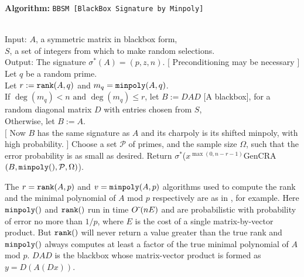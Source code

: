 \documentclass{acm_proc_article-sp}
\makeatletter
\newcommand{\softO}{{O\mskip1mu\tilde{\,}\mskip1mu}}
\newcommand{\rank}[1]{\ensuremath{\mbox{\tt rank}(#1)}}
\newcommand{\minpoly}[1]{\ensuremath{\mbox{\tt minpoly}(#1)}}
\newcommand{\shiftminpoly}[1]{\ensuremath{\mbox{\tt shiftminpoly}(#1)}}
\newlength{\Stmtindent}
\newenvironment{algorithm}[1]
{
   \setlength{\Stmtindent}{10pt}
   \def\Stmt{\@ifnextchar[{\@Stmt}{\@Stmt[]}}
   \def\@Stmt[##1]{\par\hspace*{\Stmtindent}\llap{##1\enspace\hfil}%
                   \hangindent\Stmtindent\ignorespaces}
   \def\Inspec{\par\hangindent0pt\noindent%
               \rlap{\@alginheader}\gdef\@alginheader{}%
               \hangindent1.0\Stmtindent\ignorespaces}
   \def\Outspec{\par\hangindent0pt\noindent%
                \rlap{\@algoutheader}\gdef\@algoutheader{}%
                \hangindent1.0\Stmtindent\ignorespaces}
   \def\Procspec{\par\hangindent0pt\noindent%
                \rlap{\@algprocheader}\gdef\@algprocheader{}%
                \hangindent1.0\Stmtindent\ignorespaces
				}
   \def\>{\advance\hangindent\Stmtindent\hspace*{\Stmtindent}\ignorespaces}
   \def\@alginheader{Input:}
   \def\@algoutheader{Output:}
   \def\@algprocheader{Method:}

   \parindent=0pt
   \parskip=1pt

   \medbreak\par {\bf Algorithm: }{\tt #1}
}
{\smallbreak}
\newcommand{\signature}{\ensuremath{\sigma^{*}}}
\newcommand{\M}[2]{\ensuremath{J_{#2}({#1})}}
\newcommand{\rSize}{\ensuremath{\Omega}}
\newcommand{\set}{\ensuremath{\mathcal P}}
\makeatother
\begin{document}
\begin{algorithm} {BBSM [BlackBox Signature by Minpoly]\label{bbsm}}
\\Input:  $A$, a symmetric matrix in blackbox form,\\
$S$, a set of integers from which to make random selections.
\\Output: The signature $\signature(A) = (p, z, n)$.
\Stmt[1.] $[$ Preconditioning may be necessary $]$
Let $q$ be a random prime.\\ 
Let $r := \rank{A,q}$ and $m_q = \minpoly{A, q}$.\\ 
If $\deg(m_q) < n \mbox{ and } \deg(m_q) \leq r$, 
let $B := DAD$ [A blackbox],
for a random diagonal matrix $D$ with entries chosen 
from $S$,\\
Otherwise, let $B := A$.\\
$[$ Now $B$ has the same signature as $A$ and its charpoly is 
its shifted minpoly, with high probability. ]
\Stmt[2.] Choose a set $\set$ of primes, and the sample size $\rSize$, such that
the error probability is as small as desired.
Return \signature($x^{\max(0, n-r-1)}$GenCRA$(B, \minpoly{}, \set, \rSize)$).

\end{algorithm} 

The $r = \rank{A, p}$ and $v = \minpoly{A, p}$ algorithms 
used to compute the rank and the minimal polynomial 
of $A$ mod $p$ respectively
are as in \cite{Wie86, KS91, CEKSTV02}, for example.  
Here \minpoly{} and \rank{} run in time $\softO(nE)$
and are probabilistic with probability
of error no more than $1/p$,
where $E$ is the cost of a single matrix-by-vector product.
But \rank{} will never return a value
greater than the true rank and \minpoly{} always computes at least a factor
of the true minimal polynomial of $A$ mod $p$. 
$DAD$ is the blackbox whose matrix-vector product is formed as $y = D(A(Dx))$.
\end{document}

